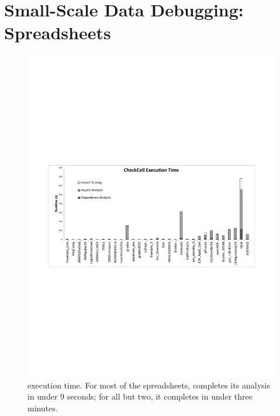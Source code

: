 \section{Small-Scale Data Debugging: Spreadsheets}
\label{sec:evaluation}

\begin{figure}[!t]
\centering
\includegraphics[width=5.5in]{execution_time_graph}
  \caption{\checkcell{} execution time. For most of the spreadsheets, \checkcell{} completes its analysis in under 9 seconds; for all but two, it completes in under three minutes.\label{fig:execution_time_graph}}
\end{figure}
 
